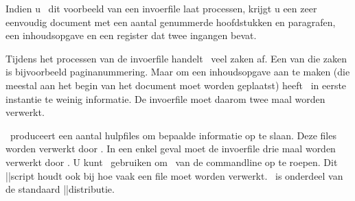Indien u \CONTEXT\ dit voorbeeld van een invoerfile laat
processen, krijgt u een zeer eenvoudig document met een
aantal genummerde hoofdstukken en paragrafen, een
inhoudsopgave en een register dat twee ingangen bevat.

Tijdens het processen van de invoerfile handelt \CONTEXT\
veel zaken af. Een van die zaken is bijvoorbeeld
paginanummering. Maar om een inhoudsopgave aan te maken (die
meestal aan het begin van het document moet worden
geplaatst) heeft \CONTEXT\ in eerste instantie te weinig
informatie. De invoerfile moet daarom twee maal worden
verwerkt.

\CONTEXT\ produceert een aantal hulpfiles om bepaalde
informatie op te slaan. Deze files worden verwerkt door
\TEXUTIL. In een enkel geval moet de invoerfile drie maal
worden verwerkt door \CONTEXT. U kunt \TEXEXEC\ gebruiken om
\CONTEXT\ van de commandline op te roepen. Dit \PERL||script
houdt ook bij hoe vaak een file moet worden verwerkt.
\TEXEXEC\ is onderdeel van de standaard \CONTEXT||distributie.

\stoponderdeel
